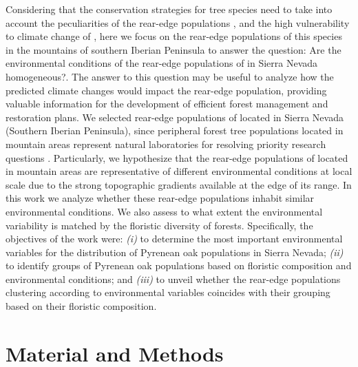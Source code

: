 Considering that the conservation strategies for tree species need to take into account the peculiarities of the rear-edge populations \autocite{HampePetit2005ConservingBiodiversity,Fadyetal2016EvolutionbasedApproach,Rehmetal2015LosingYour}, and the high vulnerability to climate change of \Qp \autocite{GarciaValdesetal2013ChasingMoving}, here we focus on the rear-edge populations of this species in the mountains of southern Iberian Peninsula to answer the question: Are the environmental conditions of the rear-edge populations of \Qp in Sierra Nevada homogeneous?. The answer to this question may be useful to analyze how the predicted climate changes would impact the rear-edge population, providing valuable information for the development of efficient forest management and restoration plans. We selected rear-edge populations of \Qp located in Sierra Nevada (Southern Iberian Peninsula), since peripheral forest tree populations located in mountain areas represent natural laboratories for resolving priority research questions \autocite{Fadyetal2016EvolutionbasedApproach}. Particularly, we hypothesize that the rear-edge populations of \Qp located in mountain areas are representative of different environmental conditions at local scale due to the strong topographic gradients available at the edge of its range. In this work we analyze whether these rear-edge populations inhabit similar environmental conditions. We also assess to what extent the environmental variability is matched by the floristic diversity of \Qp forests. Specifically, the objectives of the work were: \emph{(i)} to determine the most important environmental variables for the distribution of Pyrenean oak populations in Sierra Nevada; \emph{(ii)} to identify groups of Pyrenean oak populations based on floristic composition and environmental conditions; and \emph{(iii)} to unveil whether the rear-edge populations clustering according to environmental variables coincides with their grouping based on their floristic composition.

\section{Material and Methods}\label{sec:multivar:MatMet}
